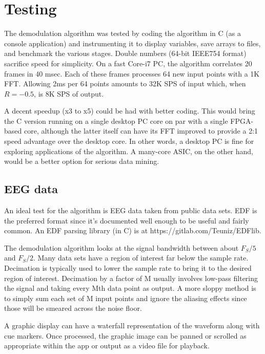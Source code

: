 \section{Testing}

The demodulation algorithm was tested by coding the algorithm in C (as a console
application) and instrumenting it to display variables,
save arrays to files, and benchmark the various stages.
Double numbers (64-bit IEEE754 format) sacrifice speed for simplicity.
On a fast Core-i7 PC, the algorithm correlates 20 frames in 40 msec.
Each of these frames processes 64 new input points with a 1K FFT.
Allowing 2ms per 64 points amounts to 32K SPS of input which, when $R=-0.5$,
is 8K SPS of output.

A decent speedup (x3 to x5) could be had with better coding. 
This would bring the C version running on a single desktop PC core on par with
a single FPGA-based core, although the latter itself can have its FFT improved
to provide a 2:1 speed advantage over the desktop core.
In other words, a desktop PC is fine for exploring applications of the algorithm.
A many-core ASIC, on the other hand, would be a better option for serious data
mining.

\subsection{EEG data}

An ideal test for the algorithm is EEG data taken from public data sets.
EDF is the preferred format since it's documented well enough to be useful
and fairly common. 
An EDF parsing library (in C) is at https://gitlab.com/Teuniz/EDFlib.

The demodulation algorithm looks at the signal bandwidth between about
$F_S/5$ and $F_S/2$.
Many data sets have a region of interest far below the sample rate.
Decimation is typically used to lower the sample rate to bring it to the
desired region of interest. 
Decimation by a factor of M usually involves low-pass filtering the signal
and taking every Mth data point as output.
A more sloppy method is to simply sum each set of M input points and ignore
the aliasing effects since those will be smeared across the noise floor.

A graphic display can have a waterfall representation of the waveform along
with cue markers. Once processed, the graphic image can be panned or scrolled
as appropriate within the app or output as a video file for playback.


